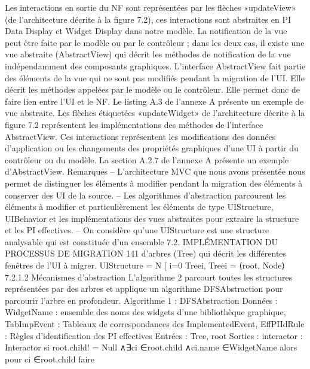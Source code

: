 \documentclass{article}
\begin{document}
Les interactions en sortie du NF sont repr\'{e}sent\'{e}es par les ﬂ\`{e}ches «updateView» (de l’architecture
d\'{e}crite \`{a} la ﬁgure 7.2), ces interactions sont abstraites en PI Data Display et Widget Display dans
notre mod\`{e}le. La notiﬁcation de la vue peut \^{e}tre faite par le mod\`{e}le ou par le contr\^{o}leur ; dans les
deux cas, il existe une vue abstraite (AbstractView) qui d\'{e}crit les m\'{e}thodes de notiﬁcation de la vue
ind\'{e}pendamment des composants graphiques.
L’interface AbstractView fait partie des \'{e}l\'{e}ments de la vue qui ne sont pas modiﬁ\'{e}s pendant la
migration de l’UI. Elle d\'{e}crit les m\'{e}thodes appel\'{e}es par le mod\`{e}le ou le contr\^{o}leur. Elle permet donc
de faire lien entre l’UI et le NF. Le listing A.3 de l’annexe A pr\'{e}sente un exemple de vue abstraite.
Les ﬂ\`{e}ches \'{e}tiquet\'{e}es «updateWidget» de l’architecture d\'{e}crite \`{a} la ﬁgure 7.2 repr\'{e}sentent les
impl\'{e}mentations des m\'{e}thodes de l’interface AbstractView. Ces interactions repr\'{e}sentent les modiﬁcations des donn\'{e}es d’application ou les changements des propri\'{e}t\'{e}s graphiques d’une UI \`{a} partir du
contr\^{o}leur ou du mod\`{e}le. La section A.2.7 de l’annexe A pr\'{e}sente un exemple d’AbstractView.
Remarques
– L’architecture MVC que nous avons pr\'{e}sent\'{e}e nous permet de distinguer les \'{e}l\'{e}ments \`{a} modiﬁer
pendant la migration des \'{e}l\'{e}ments \`{a} conserver des UI de la source.
– Les algorithmes d’abstraction parcourent les \'{e}l\'{e}ments \`{a} modiﬁer et particuli\`{e}rement les \'{e}l\'{e}ments de type UIStructure, UIBehavior et les impl\'{e}mentations des vues abstraites pour extraire
la structure et les PI effectives.
– On consid\`{e}re qu’une UIStructure est une structure analysable qui est constitu\'{e}e d’un ensemble
7.2. IMPLÉMENTATION DU PROCESSUS DE MIGRATION
141
d’arbres (Tree) qui d\'{e}crit les diff\'{e}rentes fen\^{e}tres de l’UI \`{a} migrer.
UIStructure =
N
[
i=0
Treei, Treei = ⟨root, Node⟩
7.2.1.2
M\'{e}canismes d’abstraction
L’algorithme 2 parcourt toutes les structures repr\'{e}sent\'{e}es par des arbres et applique un algorithme
DFSAbstraction pour parcourir l’arbre en profondeur.
Algorithme 1 : DFSAbstraction
Donn\'{e}es : WidgetName : ensemble des noms des widgets d’une biblioth\`{e}que graphique,
TabImpEvent : Tableaux de correspondances des ImplementedEvent, EffPIIdRule :
R\`{e}gles d’identiﬁcation des PI effectives
Entr\'{e}es : Tree, root
Sorties : interactor : Interactor
si root.child! = Null ∧∃ci ∈root.child ∧ci.name ∈WidgetName alors
pour ci ∈root.child faire
\end{document}
